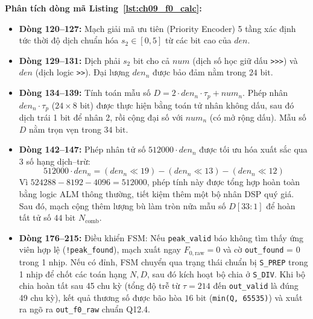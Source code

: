 

\textbf{Phân tích dòng mã Listing~\ref{lst:ch09_f0_calc}:}
\begin{itemize}[leftmargin=1.5em, itemsep=2pt]
    \item \textbf{Dòng 120--127:} Mạch giải mã ưu tiên (Priority Encoder) 5 tầng xác định tức thời độ dịch chuẩn hóa $s_2 \in [0, 5]$ từ các bit cao của $den$.
    \item \textbf{Dòng 129--131:} Dịch phải $s_2$ bit cho cả $num$ (dịch số học giữ dấu \texttt{>>>}) và $den$ (dịch logic \texttt{>>}). Đại lượng $den_n$ được bảo đảm nằm trong $24\text{ bit}$.
    \item \textbf{Dòng 134--139:} Tính toán mẫu số $D = 2 \cdot den_n \cdot \tau_p + num_n$. Phép nhân $den_n \cdot \tau_p$ ($24 \times 8\text{ bit}$) được thực hiện bằng toán tử nhân không dấu, sau đó dịch trái 1 bit để nhân 2, rồi cộng đại số với $num_n$ (có mở rộng dấu). Mẫu số $D$ nằm trọn vẹn trong $34\text{ bit}$.
    \item \textbf{Dòng 142--147:} Phép nhân tử số $512000 \cdot den_n$ được tối ưu hóa xuất sắc qua 3 số hạng dịch--trừ:
    \begin{equation}
    512000 \cdot den_n = (den_n \ll 19) - (den_n \ll 13) - (den_n \ll 12)
    \end{equation}
    Vì $524288 - 8192 - 4096 = 512000$, phép tính này được tổng hợp hoàn toàn bằng logic ALM thông thường, tiết kiệm thêm một bộ nhân DSP quý giá. Sau đó, mạch cộng thêm lượng bù làm tròn nửa mẫu số $D[33:1]$ để hoàn tất tử số $44\text{ bit}$ $N_{\text{comb}}$.
    \item \textbf{Dòng 176--215:} Điều khiển FSM: Nếu \texttt{peak\_valid} báo không tìm thấy ứng viên hợp lệ (\texttt{!peak\_found}), mạch xuất ngay $F_{0, \text{raw}} = 0$ và cờ \texttt{out\_found} = 0 trong 1 nhịp. Nếu có đỉnh, FSM chuyển qua trạng thái chuẩn bị \texttt{S\_PREP} trong 1 nhịp để chốt các toán hạng $N, D$, sau đó kích hoạt bộ chia ở \texttt{S\_DIV}. Khi bộ chia hoàn tất sau 45 chu kỳ (tổng độ trễ từ $\tau = 214$ đến \texttt{out\_valid} là đúng 49 chu kỳ), kết quả thương số được bão hòa $16\text{ bit}$ (\texttt{min(Q, 65535)}) và xuất ra ngõ ra \texttt{out\_f0\_raw} chuẩn Q12.4.
\end{itemize}

